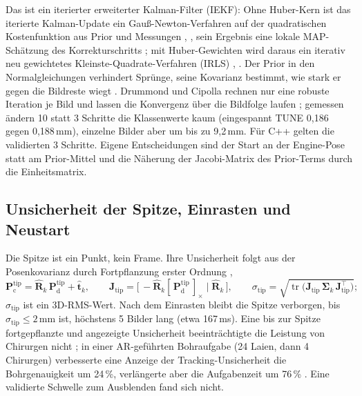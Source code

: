 \documentclass[11pt,a4paper,fleqn]{article}
\newcommand{\Ptd}{\mathbf{P}^{\mathrm{tip}}_{\mathrm{d}}}
\newcommand{\Ptc}{\mathbf{P}^{\mathrm{tip}}_{\mathrm{c}}}
\newcommand{\stip}{\sigma_{\mathrm{tip}}}
\newcommand{\cross}[1]{[\,#1\,]_{\times}}
\begin{document}
Das ist ein iterierter erweiterter Kalman-Filter (IEKF): Ohne Huber-Kern ist das iterierte Kalman-Update ein
Gauß-Newton-Verfahren auf der quadratischen Kostenfunktion aus Prior und Messungen
\cite[S.~30]{lepetit2005monocular}, \cite{bell1993iterated}, sein Ergebnis eine lokale MAP-Schätzung des
Korrekturschritts \cite[§4.2.5--4.2.6]{barfoot2017state}; mit Huber-Gewichten wird daraus ein iterativ neu
gewichtetes Kleinste-Quadrate-Verfahren (IRLS) \cite[§9.4]{zhang1997parameter}, \cite[§5.3.2]{barfoot2017state}.
Der Prior in den Normalgleichungen verhindert Sprünge, seine Kovarianz bestimmt, wie stark er gegen die Bildreste
wiegt \cite[Abschn.~IV-B]{kerl2013robust}. Drummond und Cipolla rechnen nur eine robuste Iteration je Bild und
lassen die Konvergenz über die Bildfolge laufen \cite[S.~937]{drummond2002realtime}; gemessen ändern 10 statt 3
Schritte die Klassenwerte kaum (eingespannt TUNE 0,186 gegen 0,188\,mm), einzelne Bilder aber um bis zu 9,2\,mm.
Für C++ gelten die validierten 3 Schritte. Eigene Entscheidungen sind der Start an der Engine-Pose statt am Prior-Mittel und die
Näherung der Jacobi-Matrix des Prior-Terms durch die Einheitsmatrix.

\subsection{Unsicherheit der Spitze, Einrasten und Neustart}

Die Spitze ist ein Punkt, kein Frame. Ihre Unsicherheit folgt aus der Posenkovarianz durch Fortpflanzung erster
Ordnung \cite[Gl.~55]{sola2018micro},
\begin{equation}
  \Ptc = \hat{\mathbf{R}}_k\,\Ptd + \hat{\mathbf{t}}_k, \qquad
  \mathbf{J}_{\mathrm{tip}} = \bigl[\,-\hat{\mathbf{R}}_k\cross{\Ptd} \mid \hat{\mathbf{R}}_k\,\bigr], \qquad
  \stip = \sqrt{\operatorname{tr}\bigl(\mathbf{J}_{\mathrm{tip}}\,\boldsymbol{\Sigma}_k\,\mathbf{J}_{\mathrm{tip}}^{\top}\bigr)} ;
  \label{eq:tip}
\end{equation}
$\stip$ ist ein 3D-RMS-Wert. Nach dem Einrasten bleibt die Spitze verborgen, bis $\stip \le 2$\,mm ist, höchstens
5 Bilder lang (etwa 167\,ms). Eine bis zur Spitze fortgepflanzte und angezeigte Unsicherheit beeinträchtigte die
Leistung von Chirurgen nicht \cite{simpson2014computation}; in einer AR-geführten Bohraufgabe (24 Laien, dann
4 Chirurgen) verbesserte eine Anzeige der Tracking-Unsicherheit die Bohrgenauigkeit um 24\,\%, verlängerte aber
die Aufgabenzeit um 76\,\% \cite{acherki2026visualization}. Eine validierte Schwelle zum Ausblenden fand sich
nicht.
\end{document}
